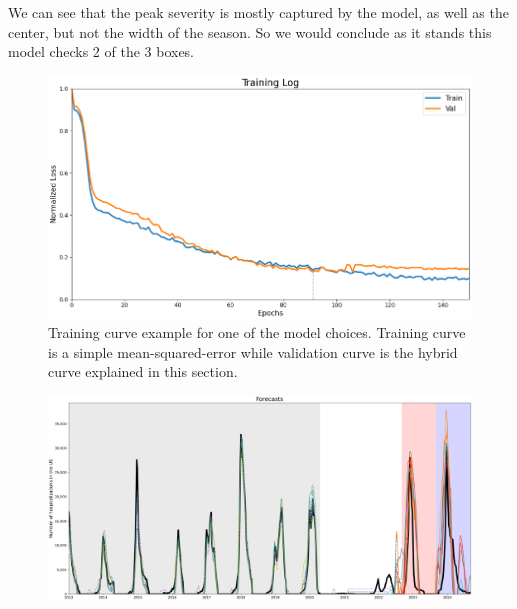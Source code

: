 \documentclass[12pt,a4paper,english]{article}
\begin{document}
We can see that the peak severity is mostly captured by the model, as well as the center, but not the width of the season. So we would conclude as it stands this model checks 2 of the 3 boxes. 




	\begin{figure}[h!]
		\begin{center}
		\includegraphics[scale=0.6]{Pictures/TrainEx.png}
		\caption{Training curve example for one of the model choices.  Training curve is a simple mean-squared-error while validation curve is the hybrid curve explained in this section.}
		\end{center}
		\label{fig:lstm_train}
	\end{figure}
\FloatBarrier



\begin{figure}[h!]
		\begin{center}
		\includegraphics[scale=0.45]{Pictures/ModelVariation.PNG}
		\caption{}
		\end{center}
		\label{fig:full}
	\end{figure}
\FloatBarrier
\end{document}
